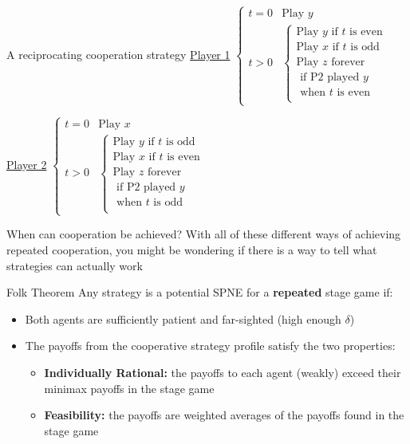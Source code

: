 \begin{frame}{A reciprocating cooperation strategy}
    \underline{Player 1}
    $
      \begin{cases}
        t=0 & \text{Play } y \\ 
        t>0 & 
        \begin{cases}
          \text{Play } y \text{ if } t \text { is even } \\ 
          \text{Play } x \text{ if } t \text { is odd } \\ 
          \text{Play } z \text{ forever } \\
          \text{ if P2 played } y \\ 
          \text{ when $t$ is even} \\ 
        \end{cases}
      \end{cases} 
    $

    \underline{Player 2}
    $
      \begin{cases}
        t=0 & \text{Play } x \\ 
        t>0 & 
        \begin{cases}
          \text{Play } y \text{ if } t \text { is odd } \\ 
          \text{Play } x \text{ if } t \text { is even } \\ 
          \text{Play } z \text{ forever } \\
          \text{ if P2 played } y \\ 
          \text{ when $t$ is odd} \\ 
        \end{cases}
      \end{cases} 
      $
\end{frame}

\begin{frame}{When can cooperation be achieved?}
  With all of these different ways of achieving repeated cooperation, 
  you might be wondering if there is a way to tell what strategies can actually work
\end{frame}

\begin{frame}{Folk Theorem}
  Any strategy is a potential SPNE for a \textbf{repeated} stage game if: 
  \begin{itemize}
    \item Both agents are sufficiently patient and far-sighted (high enough $\delta$)
    \item The payoffs from the cooperative strategy profile satisfy the two properties: 
    \begin{itemize}
      \item \textbf{Individually Rational:} the payoffs to each agent (weakly) exceed their minimax payoffs in the stage game 
      \item \textbf{Feasibility:} the payoffs are weighted averages of the payoffs found in the stage game
    \end{itemize}
  \end{itemize}
\end{frame}

